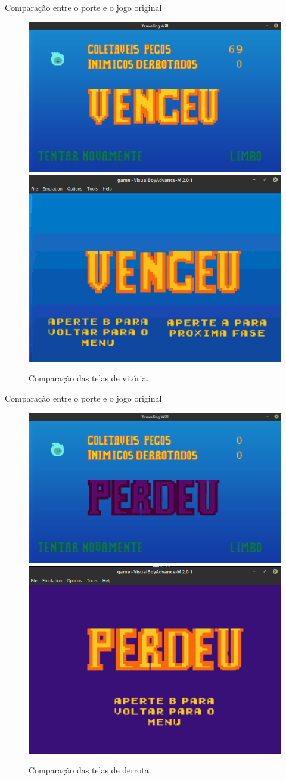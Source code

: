 \documentclass[notes, mathserif]{beamer}
\begin{document}
\begin{frame}{Compara\c c\~ao entre o porte e o jogo original}
	\begin{figure}%
    \includegraphics[width=.5\linewidth]{figuras/pc-vitoria.png}
    \qquad
    \includegraphics[width=.4\linewidth]{figuras/gba-vitoria.png}
    \caption{Compara\c c\~ao das telas de vit\'oria.}%
    \label{fig:comp1}%
	\end{figure}
\end{frame}

\begin{frame}{Compara\c c\~ao entre o porte e o jogo original}
	\begin{figure}%
    \includegraphics[width=.5\linewidth]{figuras/pc-derrota.png}
    \qquad
    \includegraphics[width=.4\linewidth]{figuras/gba-derrota.png}
    \caption{Compara\c c\~ao das telas de derrota.}%
    \label{fig:comp1}%
	\end{figure}
\end{frame}
\end{document}
